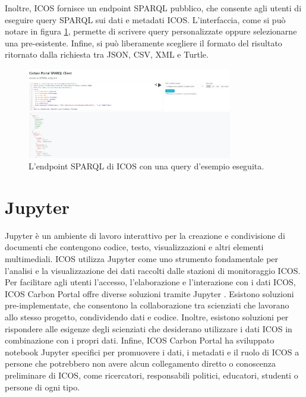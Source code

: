 Inoltre, ICOS fornisce un endpoint SPARQL pubblico,
che consente agli utenti di eseguire query SPARQL sui dati
e metadati ICOS. L'interfaccia, come si può notare in figura \ref{figure:sparqlendpoint}, permette di scrivere query personalizzate
oppure selezionarne una pre-esistente. Infine, si può liberamente
scegliere il formato del risultato ritornato dalla richiesta tra JSON,
CSV, XML e Turtle.

\begin{figure}[h!]
    \centering
    \includegraphics[width=0.8\textwidth]{figures/sparqlendpoint.JPG}
    \caption{L'endpoint SPARQL di ICOS con una query d'esempio eseguita.}
    \label{figure:sparqlendpoint}
\end{figure}

\section{Jupyter}
\label{section:jupyter}
Jupyter è un ambiente di lavoro interattivo per la creazione e condivisione di documenti che contengono codice, testo, visualizzazioni e altri elementi multimediali.
ICOS utilizza Jupyter come uno strumento fondamentale per l'analisi e la visualizzazione dei dati raccolti dalle stazioni di monitoraggio ICOS.\\

Per facilitare agli utenti l'accesso,
l'elaborazione e l'interazione con i
dati ICOS, ICOS Carbon Portal
offre diverse soluzioni tramite Jupyter \cite{JupyterICOS}.
Esistono soluzioni pre-implementate, 
che consentono la collaborazione tra
scienziati che lavorano allo
stesso progetto, condividendo dati
e codice. Inoltre, esistono soluzioni
per rispondere alle esigenze degli
scienziati che desiderano utilizzare
i dati ICOS in combinazione con
i propri dati. Infine, ICOS
Carbon Portal ha sviluppato
notebook Jupyter specifici per promuovere i dati,
i metadati e il ruolo di ICOS a
persone che potrebbero non avere
alcun collegamento diretto o
conoscenza preliminare di ICOS,
come ricercatori, responsabili politici,
educatori, studenti o persone di ogni tipo.


